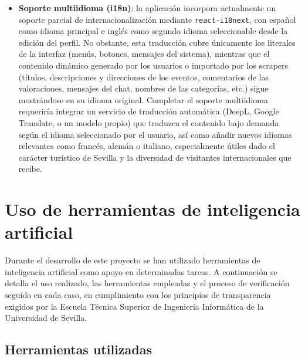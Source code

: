 \begin{itemize}
    \item \textbf{Soporte multiidioma (i18n)}: la aplicación incorpora actualmente un soporte parcial de internacionalización mediante \texttt{react-i18next}, con español como idioma principal e inglés como segundo idioma seleccionable desde la edición del perfil. No obstante, esta traducción cubre únicamente los literales de la interfaz (menús, botones, mensajes del sistema), mientras que el contenido dinámico generado por los usuarios o importado por los scrapers (títulos, descripciones y direcciones de los eventos, comentarios de las valoraciones, mensajes del chat, nombres de las categorías, etc.) sigue mostrándose en su idioma original. Completar el soporte multiidioma requeriría integrar un servicio de traducción automática (DeepL, Google Translate, o un modelo propio) que traduzca el contenido bajo demanda según el idioma seleccionado por el usuario, así como añadir nuevos idiomas relevantes como francés, alemán o italiano, especialmente útiles dado el carácter turístico de Sevilla y la diversidad de visitantes internacionales que recibe.
\end{itemize}

\section{Uso de herramientas de inteligencia artificial}

Durante el desarrollo de este proyecto se han utilizado herramientas de inteligencia artificial como apoyo en determinadas tareas. A continuación se detalla el uso realizado, las herramientas empleadas y el proceso de verificación seguido en cada caso, en cumplimiento con los principios de transparencia exigidos por la Escuela Técnica Superior de Ingeniería Informática de la Universidad de Sevilla.

\subsection{Herramientas utilizadas}


